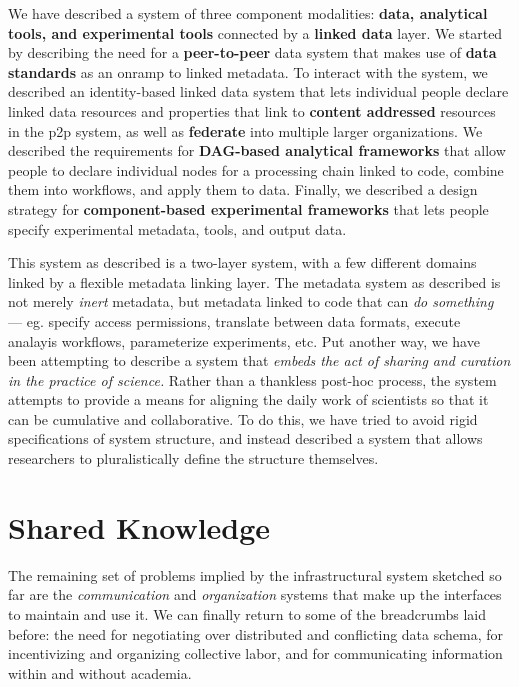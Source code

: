 We have described a system of three component modalities: \textbf{data,
analytical tools, and experimental tools} connected by a \textbf{linked
data} layer. We started by describing the need for a
\textbf{peer-to-peer} data system that makes use of \textbf{data
standards} as an onramp to linked metadata. To interact with the system,
we described an identity-based linked data system that lets individual
people declare linked data resources and properties that link to
\textbf{content addressed} resources in the p2p system, as well as
\textbf{federate} into multiple larger organizations. We described the
requirements for \textbf{DAG-based analytical frameworks} that allow
people to declare individual nodes for a processing chain linked to
code, combine them into workflows, and apply them to data. Finally, we
described a design strategy for \textbf{component-based experimental
frameworks} that lets people specify experimental metadata, tools, and
output data.

This system as described is a two-layer system, with a few different
domains linked by a flexible metadata linking layer. The metadata system
as described is not merely \emph{inert} metadata, but metadata linked to
code that can \emph{do something} --- eg. specify access permissions,
translate between data formats, execute analayis workflows, parameterize
experiments, etc. Put another way, we have been attempting to describe a
system that \emph{embeds the act of sharing and curation in the practice
of science.} Rather than a thankless post-hoc process, the system
attempts to provide a means for aligning the daily work of scientists so
that it can be cumulative and collaborative. To do this, we have tried
to avoid rigid specifications of system structure, and instead described
a system that allows researchers to pluralistically define the structure
themselves.

\hypertarget{shared-knowledge}{%
\section{Shared Knowledge}\label{shared-knowledge}}

The remaining set of problems implied by the infrastructural system
sketched so far are the \emph{communication} and \emph{organization}
systems that make up the interfaces to maintain and use it. We can
finally return to some of the breadcrumbs laid before: the need for
negotiating over distributed and conflicting data schema, for
incentivizing and organizing collective labor, and for communicating
information within and without academia.

